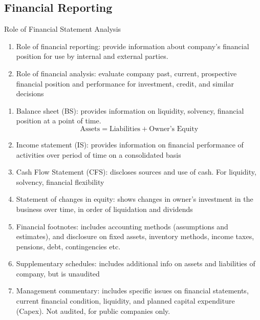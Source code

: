 \subsection{Financial Reporting}

\begin{remark} Role of Financial Statement Analysis
\begin{enumerate}[label=\roman*.]
\setlength{\itemsep}{0pt}
\item Role of financial reporting: provide information about company’s financial position for use by internal and external parties.
\item Role of financial analysis: evaluate company past, current, prospective financial position and performance for investment, credit, and similar decisions
\end{enumerate}
\end{remark}

\begin{definition} 
\begin{enumerate}[label=\roman*.]
\setlength{\itemsep}{0pt}
\item Balance sheet (BS): provides information on liquidity, solvency, financial position at a point of time.
\begin{equation}
\text{Assets} = \text{Liabilities} + \text{Owner's Equity} \nonumber
\end{equation}
\item Income statement (IS): provides information on financial performance of activities over period of time on a consolidated basis
\item Cash Flow Statement (CFS): discloses sources and use of cash. For liquidity, solvency, financial flexibility
\item Statement of changes in equity: shows changes in owner’s investment in the business over time, in order of liquidation and dividends
\item Financial footnotes: includes accounting methods (assumptions and estimates), and disclosure on fixed assets, inventory methods, income taxes, pensions, debt, contingencies etc.
\item Supplementary schedules: includes additional info on assets and liabilities of company, but is unaudited
\item Management commentary: includes specific issues on financial statements, current financial condition, liquidity, and planned capital expenditure (Capex). Not audited, for public companies only.
\end{enumerate}
\end{definition}

